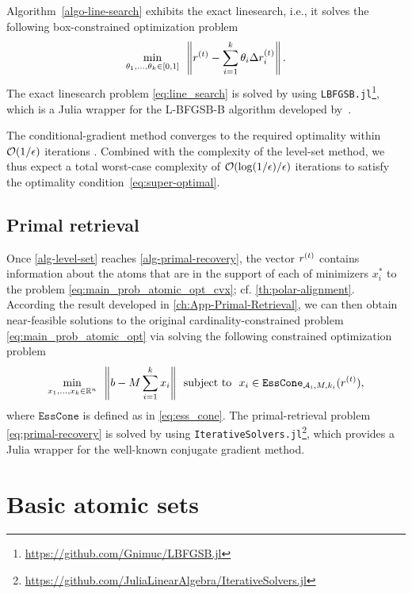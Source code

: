 Algorithm~\ref{algo-line-search} exhibits the exact linesearch, i.e., it solves the following box-constrained optimization problem
\begin{equation} \label{eq:line_search}
  \min_{\theta_1, \dots, \theta_k \in [0,1]} \enspace \left\|r^{(t)} - \sum_{i=1}^k \theta_i\Delta r_i^{(t)}\right\|.
\end{equation}
The exact linesearch problem \eqref{eq:line_search} is solved by using \texttt{LBFGSB.jl}\footnote{\url{https://github.com/Gnimuc/LBFGSB.jl}}, which is a Julia wrapper for the L-BFGSB-B algorithm developed by~\citet{zhu1997algorithm}. 

The conditional-gradient method converges to the required optimality within $\mathcal{O}(1/\epsilon)$ iterations \cite{jaggi2013revisiting}. Combined with the complexity of the level-set method, we thus expect a total worst-case complexity of $\mathcal{O}(\log(1/\epsilon)/\epsilon)$ iterations to satisfy the optimality condition~\eqref{eq:super-optimal}.

\subsection{Primal retrieval} \label{sec:primal_retrieval}
Once \autoref{alg-level-set} reaches \autoref{alg-primal-recovery}, the vector $r^{(t)}$ contains information about the atoms that are in the support of each of minimizers $x_i^*$ to the problem \eqref{eq:main_prob_atomic_opt_cvx}; cf. \autoref{th:polar-alignment}. According the result developed in \autoref{ch:App-Primal-Retrieval}, we can then obtain near-feasible solutions to the original cardinality-constrained problem \eqref{eq:main_prob_atomic_opt} via solving the following constrained optimization problem
\begin{equation} \label{eq:primal-recovery}
  \min_{x_1, \dots, x_k \in \mathbb{R}^n} \enspace \left\|b - M\sum_{i=1}^k x_i\right\| \enspace\mathop{\hbox{\rm subject to}}\enspace x_i \in \texttt{EssCone}_{\mathcal{A}_i, M, k_i}(r^{(t)}),
\end{equation}
where $\texttt{EssCone}$ is defined as in \eqref{eq:ess_cone}. The primal-retrieval problem \eqref{eq:primal-recovery} is solved by using \texttt{IterativeSolvers.jl}\footnote{\url{https://github.com/JuliaLinearAlgebra/IterativeSolvers.jl}}, which provides a Julia wrapper for the well-known conjugate gradient method.  



\section{Basic atomic sets} \label{sec:5-3}


